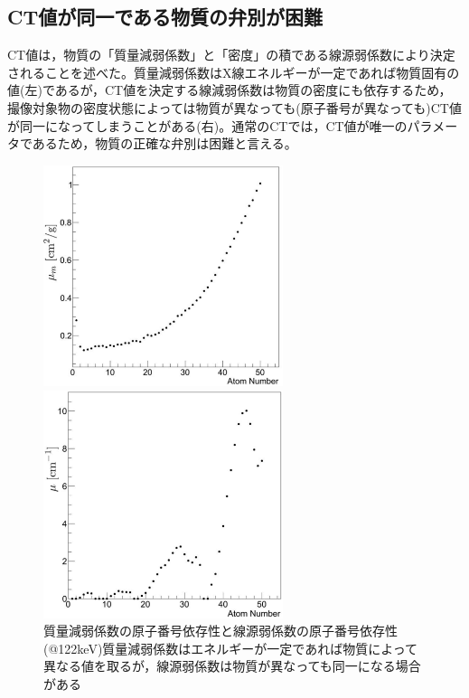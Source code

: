 \subsection{CT値が同一である物質の弁別が困難}
CT値は，物質の「質量減弱係数」と「密度」の積である線源弱係数により決定されることを述べた。質量減弱係数はX線エネルギーが一定であれば物質固有の値(左)であるが，CT値を決定する線減弱係数は物質の密度にも依存するため，撮像対象物の密度状態によっては物質が異なっても(原子番号が異なっても)CT値が同一になってしまうことがある(右)。通常のCTでは，CT値が唯一のパラメータであるため，物質の正確な弁別は困難と言える。

\begin{figure}[H]
 \begin{minipage}{0.52\hsize}
  \begin{center}
   \includegraphics[width=7cm]{image/other/mass_atten.eps}
  \end{center}
 \end{minipage}
 \begin{minipage}{0.3\hsize}
  \begin{center}
   \includegraphics[width=7cm]{image/other/linear_atten.eps}
  \end{center}
 \end{minipage}
 \begin{center}
  \vspace{-1zh}
  \caption{質量減弱係数の原子番号依存性と線源弱係数の原子番号依存性(@122keV)\newline 質量減弱係数はエネルギーが一定であれば物質によって異なる値を取るが，線源弱係数は物質が異なっても同一になる場合がある}
  \label{fig:atten}
  \end{center}
\end{figure}


